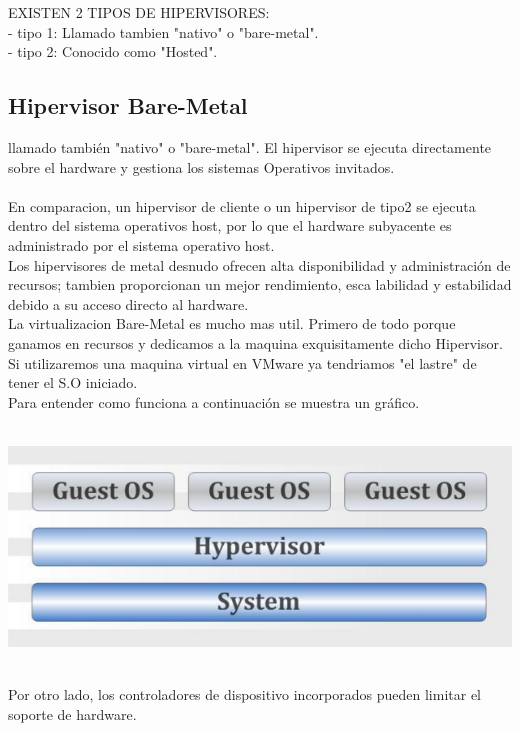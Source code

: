 \documentclass[12pt,letterpaper]{article}
\begin{document}
EXISTEN 2 TIPOS DE HIPERVISORES: \\

- tipo 1: Llamado tambien "nativo" o "bare-metal".  \\
- tipo 2: Conocido como "Hosted".

\subsection{Hipervisor Bare-Metal}

llamado también "nativo" o "bare-metal". El hipervisor se ejecuta directamente sobre el hardware y gestiona los sistemas Operativos invitados. \\ \\
En comparacion, un hipervisor de cliente o un hipervisor de tipo2 se ejecuta dentro del sistema operativos host, por lo que el hardware  subyacente es administrado por el sistema operativo host. \\
Los  hipervisores de metal desnudo ofrecen alta disponibilidad y administración de recursos; tambien proporcionan un mejor rendimiento, esca labilidad y estabilidad debido a su acceso directo al hardware. \\

La virtualizacion Bare-Metal es mucho mas util. Primero de todo porque ganamos en recursos y dedicamos a la maquina exquisitamente dicho Hipervisor. Si utilizaremos una maquina virtual en VMware ya tendriamos "el lastre" de tener el S.O iniciado. \\
Para entender como funciona a continuación se muestra un gráfico. \\ \\

\begin{center}
\includegraphics[scale=1]{IMAGENES/ejemplo.png} 
\end{center}

\\

 Por otro lado, los controladores de dispositivo incorporados pueden limitar el soporte de hardware. \\
\end{document}
